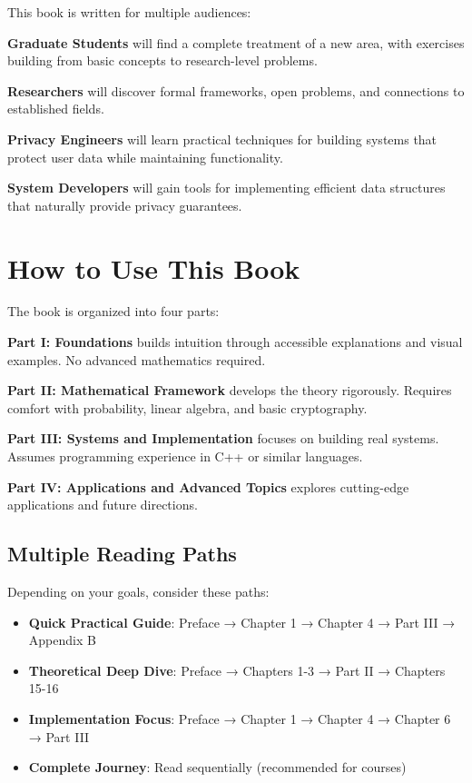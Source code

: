 This book is written for multiple audiences:

\textbf{Graduate Students} will find a complete treatment of a new area, with exercises building from basic concepts to research-level problems.

\textbf{Researchers} will discover formal frameworks, open problems, and connections to established fields.

\textbf{Privacy Engineers} will learn practical techniques for building systems that protect user data while maintaining functionality.

\textbf{System Developers} will gain tools for implementing efficient data structures that naturally provide privacy guarantees.

\section*{How to Use This Book}

The book is organized into four parts:

\textbf{Part I: Foundations} builds intuition through accessible explanations and visual examples. No advanced mathematics required.

\textbf{Part II: Mathematical Framework} develops the theory rigorously. Requires comfort with probability, linear algebra, and basic cryptography.

\textbf{Part III: Systems and Implementation} focuses on building real systems. Assumes programming experience in C++ or similar languages.

\textbf{Part IV: Applications and Advanced Topics} explores cutting-edge applications and future directions.

\subsection*{Multiple Reading Paths}

Depending on your goals, consider these paths:

\begin{itemize}
    \item \textbf{Quick Practical Guide}: Preface → Chapter 1 → Chapter 4 → Part III → Appendix B
    \item \textbf{Theoretical Deep Dive}: Preface → Chapters 1-3 → Part II → Chapters 15-16
    \item \textbf{Implementation Focus}: Preface → Chapter 1 → Chapter 4 → Chapter 6 → Part III
    \item \textbf{Complete Journey}: Read sequentially (recommended for courses)
\end{itemize}

